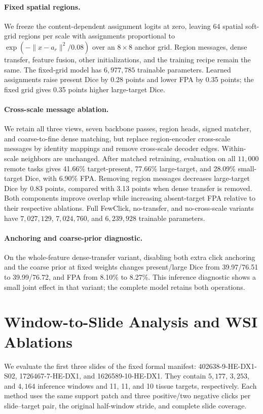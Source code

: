 \paragraph{Fixed spatial regions.}
We freeze the content-dependent assignment logits at zero, leaving 64 spatial soft-grid regions per scale with assignments proportional to $\exp(-\|x-a_r\|^2/0.08)$ over an $8\times8$ anchor grid. Region messages, dense transfer, feature fusion, other initializations, and the training recipe remain the same. The fixed-grid model has $6{,}977{,}785$ trainable parameters. Learned assignments raise present Dice by 0.28 points and lower FPA by 0.35 points; the fixed grid gives 0.35 points higher large-target Dice.

\paragraph{Cross-scale message ablation.}
We retain all three views, seven backbone passes, region heads, signed matcher, and coarse-to-fine dense matching, but replace region-encoder cross-scale messages by identity mappings and remove cross-scale decoder edges. Within-scale neighbors are unchanged. After matched retraining, evaluation on all $11{,}000$ remote tasks gives 41.66\% target-present, 77.66\% large-target, and 28.09\% small-target Dice, with 6.90\% FPA. Removing region messages decreases large-target Dice by 0.83 points, compared with 3.13 points when dense transfer is removed. Both components improve overlap while increasing absent-target FPA relative to their respective ablations. Full FewClick, no-transfer, and no-cross-scale variants have $7{,}027{,}129$, $7{,}024{,}760$, and $6{,}239{,}928$ trainable parameters.

\paragraph{Anchoring and coarse-prior diagnostic.}
On the whole-feature dense-transfer variant, disabling both extra click anchoring and the coarse prior at fixed weights changes present/large Dice from 39.97/76.51 to 39.99/76.72, and FPA from 8.10\% to 8.27\%. This inference diagnostic shows a small joint effect in that variant; the complete model retains both operations.

\section{Window-to-Slide Analysis and WSI Ablations}

We evaluate the first three slides of the fixed formal manifest: 402638-9-HE-DX1-S02, 1726467-7-HE-DX1, and 1626589-10-HE-DX1. They contain $5{,}177$, $3{,}253$, and $4{,}164$ inference windows and 11, 11, and 10 tissue targets, respectively. Each method uses the same support patch and three positive/two negative clicks per slide--target pair, the original half-window stride, and complete slide coverage.

